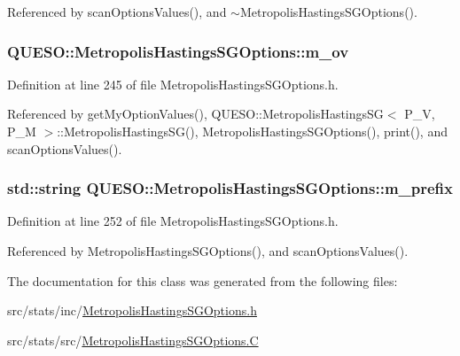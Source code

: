 Referenced by scan\-Options\-Values(), and $\sim$\-Metropolis\-Hastings\-S\-G\-Options().

\hypertarget{class_q_u_e_s_o_1_1_metropolis_hastings_s_g_options_a9d4792d9fc2dc5439b8ab489b0c236eb}{
\subsubsection[{m\-\_\-ov}]{ Q\-U\-E\-S\-O\-::\-Metropolis\-Hastings\-S\-G\-Options\-::m\-\_\-ov}}\label{class_q_u_e_s_o_1_1_metropolis_hastings_s_g_options_a9d4792d9fc2dc5439b8ab489b0c236eb}


Definition at line 245 of file Metropolis\-Hastings\-S\-G\-Options.\-h.



Referenced by get\-My\-Option\-Values(), Q\-U\-E\-S\-O\-::\-Metropolis\-Hastings\-S\-G$<$ P\-\_\-\-V, P\-\_\-\-M $>$\-::\-Metropolis\-Hastings\-S\-G(), Metropolis\-Hastings\-S\-G\-Options(), print(), and scan\-Options\-Values().

\hypertarget{class_q_u_e_s_o_1_1_metropolis_hastings_s_g_options_a4f7c510aaa530336d24259e2a89f5d0b}{
\subsubsection[{m\-\_\-prefix}]{\setlength{\rightskip}{0pt plus 5cm}std\-::string Q\-U\-E\-S\-O\-::\-Metropolis\-Hastings\-S\-G\-Options\-::m\-\_\-prefix}}\label{class_q_u_e_s_o_1_1_metropolis_hastings_s_g_options_a4f7c510aaa530336d24259e2a89f5d0b}


Definition at line 252 of file Metropolis\-Hastings\-S\-G\-Options.\-h.



Referenced by Metropolis\-Hastings\-S\-G\-Options(), and scan\-Options\-Values().



The documentation for this class was generated from the following files\-:\begin{DoxyCompactItemize}
\item 
src/stats/inc/\hyperlink{_metropolis_hastings_s_g_options_8h}{Metropolis\-Hastings\-S\-G\-Options.\-h}\item 
src/stats/src/\hyperlink{_metropolis_hastings_s_g_options_8_c}{Metropolis\-Hastings\-S\-G\-Options.\-C}\end{DoxyCompactItemize}
